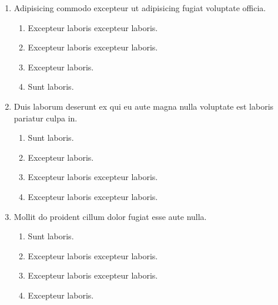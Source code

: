 \documentclass[a4paper,12pt]{article}
\begin{document}
\begin{enumerate}[label=\textbf{\arabic*.}]
\begin{multicols}{2}
\end{multicols}
\item Adipisicing commodo excepteur ut adipisicing fugiat voluptate officia.
\begin{multicols}{2}
	\begin{enumerate}
		\item  Excepteur laboris excepteur laboris.
  
		\item  Excepteur laboris excepteur laboris.
    
		\item  Excepteur laboris.
    
		\item  Sunt laboris.
    
	\end{enumerate}

\end{multicols}
\item Duis laborum deserunt ex qui eu aute magna nulla voluptate est laboris pariatur culpa in.
\begin{multicols}{2}
	\begin{enumerate}
		\item  Sunt laboris.
    
		\item  Excepteur laboris.
    
		\item  Excepteur laboris excepteur laboris.
    
		\item  Excepteur laboris excepteur laboris.
  
	\end{enumerate}

\end{multicols}
\item Mollit do proident cillum dolor fugiat esse aute nulla.
\begin{multicols}{2}
	\begin{enumerate}
		\item  Sunt laboris.
    
		\item  Excepteur laboris excepteur laboris.
    
		\item  Excepteur laboris excepteur laboris.
  
		\item  Excepteur laboris.
    
	\end{enumerate}


\end{multicols}
\end{enumerate}
\end{document}
